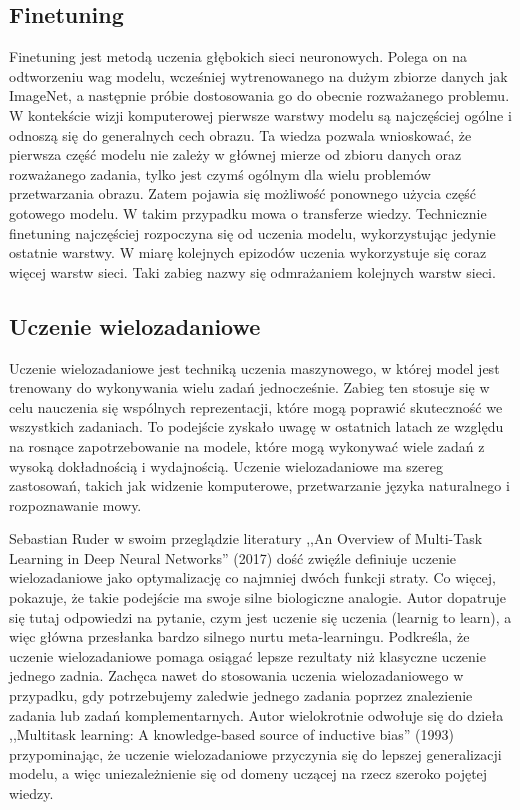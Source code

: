 \subsection{Finetuning}
Finetuning jest metodą uczenia głębokich sieci neuronowych. Polega on na odtworzeniu wag modelu, wcześniej wytrenowanego na dużym zbiorze danych jak ImageNet, a następnie próbie dostosowania go do obecnie rozważanego problemu. W kontekście wizji komputerowej pierwsze warstwy modelu są najczęściej ogólne i odnoszą się do generalnych cech obrazu. Ta wiedza pozwala wnioskować, że pierwsza część modelu nie zależy w głównej mierze od zbioru danych oraz rozważanego zadania, tylko jest czymś ogólnym dla wielu problemów przetwarzania obrazu. Zatem pojawia się możliwość ponownego użycia część gotowego modelu. W takim przypadku mowa o transferze wiedzy. Technicznie finetuning najczęściej rozpoczyna się od uczenia modelu, wykorzystując jedynie ostatnie warstwy. W miarę kolejnych epizodów uczenia wykorzystuje się coraz więcej warstw sieci. Taki zabieg nazwy się odmrażaniem kolejnych warstw sieci.
\subsection{Uczenie wielozadaniowe}
Uczenie wielozadaniowe jest techniką uczenia maszynowego, w której model jest trenowany do wykonywania wielu zadań jednocześnie. Zabieg ten stosuje się w celu nauczenia się wspólnych reprezentacji, które mogą poprawić skuteczność we wszystkich zadaniach. To podejście zyskało uwagę w ostatnich latach ze względu na rosnące zapotrzebowanie na modele, które mogą wykonywać wiele zadań z wysoką dokładnością i wydajnością. Uczenie wielozadaniowe ma szereg zastosowań, takich jak widzenie komputerowe, przetwarzanie języka naturalnego i rozpoznawanie mowy.

Sebastian Ruder w swoim przeglądzie literatury ,,An Overview of Multi-Task Learning in Deep Neural Networks'' (2017) \cite{ruder2017overview} dość zwięźle definiuje uczenie wielozadaniowe jako optymalizację co najmniej dwóch funkcji straty. Co więcej, pokazuje, że takie podejście ma swoje silne biologiczne analogie. Autor dopatruje się tutaj odpowiedzi na pytanie, czym jest uczenie się uczenia (learnig to learn), a więc główna przesłanka bardzo silnego nurtu meta-learningu. Podkreśla, że uczenie wielozadaniowe pomaga osiągać lepsze rezultaty niż klasyczne uczenie jednego zadnia. Zachęca nawet do stosowania uczenia wielozadaniowego w przypadku, gdy potrzebujemy zaledwie jednego zadania poprzez znalezienie zadania lub zadań komplementarnych. Autor wielokrotnie odwołuje się do dzieła ,,Multitask learning: A knowledge-based source of inductive bias'' (1993) \cite{caruana1993multitask} przypominając, że uczenie wielozadaniowe przyczynia się do lepszej generalizacji modelu, a więc uniezależnienie się od domeny uczącej na rzecz szeroko pojętej wiedzy.

